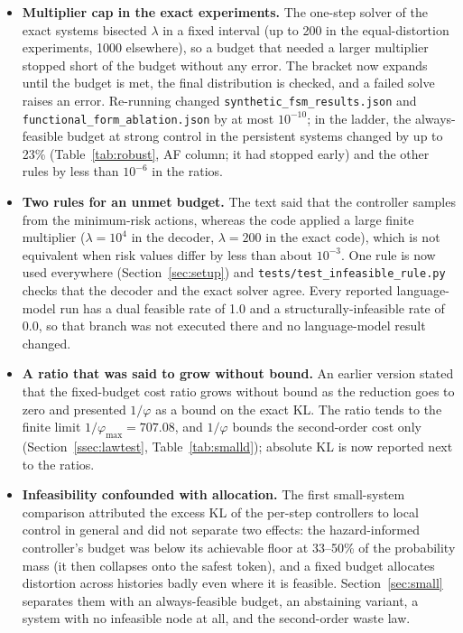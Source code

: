 \begin{itemize}[leftmargin=*]
\item \textbf{Multiplier cap in the exact experiments.} The one-step solver of the exact systems bisected $\lambda$ in a fixed interval (up to 200 in the equal-distortion experiments, 1000 elsewhere), so a budget that needed a larger multiplier stopped short of the budget without any error. The bracket now expands until the budget is met, the final distribution is checked, and a failed solve raises an error. Re-running changed \texttt{synthetic\_\allowbreak{}fsm\_\allowbreak{}results.json} and \texttt{functional\_\allowbreak{}form\_\allowbreak{}ablation.json} by at most $10^{-10}$; in the ladder, the always-feasible budget at strong control in the persistent systems changed by up to 23\% (Table~\ref{tab:robust}, AF column; it had stopped early) and the other rules by less than $10^{-6}$ in the ratios.
  \item \textbf{Two rules for an unmet budget.} The text said that the controller samples from the minimum-risk actions, whereas the code applied a large finite multiplier ($\lambda=10^{4}$ in the decoder, $\lambda=200$ in the exact code), which is not equivalent when risk values differ by less than about $10^{-3}$. One rule is now used everywhere (Section~\ref{sec:setup}) and \texttt{tests/test\_\allowbreak{}infeasible\_\allowbreak{}rule.py} checks that the decoder and the exact solver agree. Every reported language-model run has a dual feasible rate of 1.0 and a structurally-infeasible rate of 0.0, so that branch was not executed there and no language-model result changed.
  \item \textbf{A ratio that was said to grow without bound.} An earlier version stated that the fixed-budget cost ratio grows without bound as the reduction goes to zero and presented $1/\varphi$ as a bound on the exact KL. The ratio tends to the finite limit $1/\varphi_{\max}=707.08$, and $1/\varphi$ bounds the second-order cost only (Section~\ref{ssec:lawtest}, Table~\ref{tab:smalld}); absolute KL is now reported next to the ratios.
  \item \textbf{Infeasibility confounded with allocation.} The first small-system comparison attributed the excess KL of the per-step controllers to local control in general and did not separate two effects: the hazard-informed controller's budget was below its achievable floor at 33--50\% of the probability mass (it then collapses onto the safest token), and a fixed budget allocates distortion across histories badly even where it is feasible. Section~\ref{sec:small} separates them with an always-feasible budget, an abstaining variant, a system with no infeasible node at all, and the second-order waste law.
\end{itemize}

